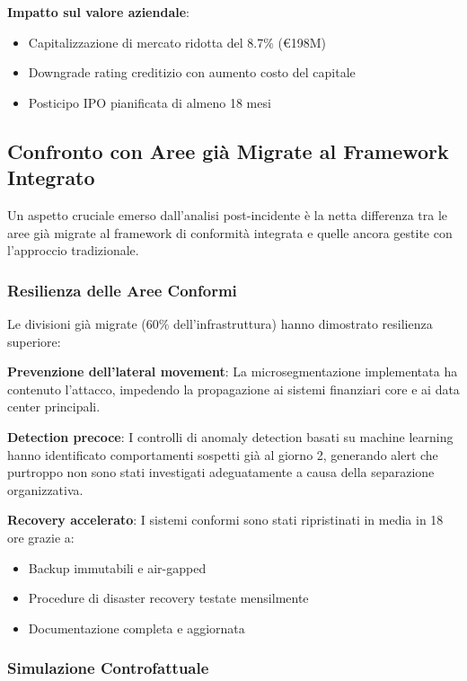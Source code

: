 \textbf{Impatto sul valore aziendale}:
\begin{itemize}
    \item Capitalizzazione di mercato ridotta del 8.7\% (€198M)
    \item Downgrade rating creditizio con aumento costo del capitale
    \item Posticipo IPO pianificata di almeno 18 mesi
\end{itemize}

\subsection{Confronto con Aree già Migrate al Framework Integrato}
\label{subsec:4.8.3_confronto}

Un aspetto cruciale emerso dall'analisi post-incidente è la netta differenza tra le aree già migrate al framework di conformità integrata e quelle ancora gestite con l'approccio tradizionale.

\subsubsection{Resilienza delle Aree Conformi}

Le divisioni già migrate (60\% dell'infrastruttura) hanno dimostrato resilienza superiore:

\textbf{Prevenzione dell'lateral movement}: La microsegmentazione implementata ha contenuto l'attacco, impedendo la propagazione ai sistemi finanziari core e ai data center principali.

\textbf{Detection precoce}: I controlli di anomaly detection basati su machine learning hanno identificato comportamenti sospetti già al giorno 2, generando alert che purtroppo non sono stati investigati adeguatamente a causa della separazione organizzativa.

\textbf{Recovery accelerato}: I sistemi conformi sono stati ripristinati in media in 18 ore grazie a:
\begin{itemize}
    \item Backup immutabili e air-gapped
    \item Procedure di disaster recovery testate mensilmente  
    \item Documentazione completa e aggiornata
\end{itemize}

\subsubsection{Simulazione Controfattuale}

